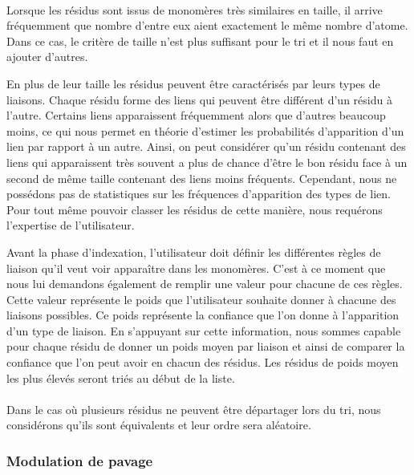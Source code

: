 \documentclass[12pt,french,twoside]{report}
\begin{document}
\paragraph{}Lorsque les résidus sont issus de monomères très similaires en taille, il arrive fréquemment que nombre d'entre eux
aient exactement le même nombre d'atome.
Dans ce cas, le critère de taille n'est plus suffisant pour le tri et il nous faut en ajouter d'autres.

En plus de leur taille les résidus peuvent être caractérisés par leurs types de liaisons.
Chaque résidu forme des liens qui peuvent être différent d'un résidu à l'autre.
Certains liens apparaissent fréquemment alors que d'autres beaucoup moins, ce qui nous permet en théorie d'estimer les
probabilités d'apparition d'un lien par rapport à un autre.
Ainsi, on peut considérer qu'un résidu contenant des liens qui apparaissent très souvent a plus de chance d'être le bon résidu
face à un second de même taille contenant des liens moins fréquents.
Cependant, nous ne possédons pas de statistiques sur les fréquences d'apparition des types de lien.
Pour tout même pouvoir classer les résidus de cette manière, nous requérons l'expertise de l'utilisateur.

Avant la phase d'indexation, l'utilisateur doit définir les différentes
règles de liaison qu'il veut voir apparaître dans les monomères. C'est à ce moment que nous lui demandons également de remplir
une valeur pour chacune de ces règles. Cette valeur représente le poids que l'utilisateur souhaite donner à chacune des liaisons
possibles. Ce poids représente la confiance que l'on donne à l'apparition d'un type de liaison. En s'appuyant sur cette
information, nous
sommes capable pour chaque résidu de donner un poids moyen par liaison et ainsi de comparer la confiance que l'on peut
avoir en chacun des résidus. Les résidus de poids moyen les plus élevés seront triés au début de la liste.

\paragraph{}Dans le cas où plusieurs résidus ne peuvent être départager lors du tri, nous considérons qu'ils sont équivalents et
leur ordre sera aléatoire.


\subsubsection{Modulation de pavage}
\end{document}

